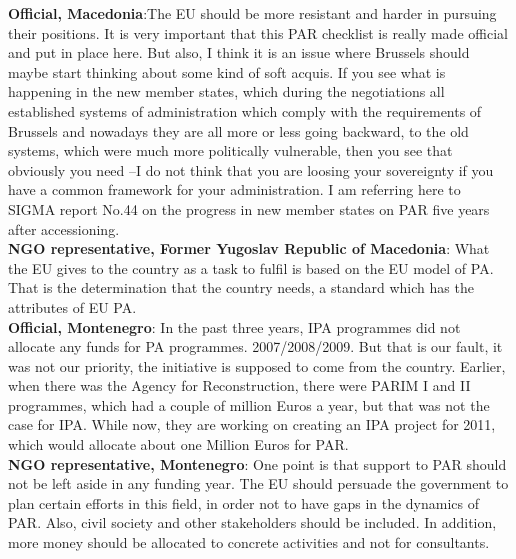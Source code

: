 \textbf{Official, Macedonia}:The EU should be more resistant and harder in pursuing their positions. It is very important that this PAR checklist is really made official and put in place here. But also, I think it is an issue where Brussels should maybe start thinking about some kind of soft acquis. If you see what is happening in the new member states, which during the negotiations all established systems of administration which comply with the requirements of Brussels and nowadays they are all more or less going backward, to the old systems, which were much more politically vulnerable, then you see that obviously you need –I do not think that you are loosing your sovereignty if you have a common framework for your administration. I am referring here to SIGMA report No.44 on the progress in new member states on PAR five years after accessioning. \\
\textbf{NGO representative, Former Yugoslav Republic of Macedonia}: What the EU gives to the country as a task to fulfil is based on the EU model of PA. That is the determination that the country needs, a standard which has the attributes of EU PA. \\
\textbf{Official, Montenegro}: In the past three years, IPA programmes did not allocate any funds for PA programmes. 2007/2008/2009. But that is our fault, it was not our priority, the initiative is supposed to come from the country. Earlier, when there was the Agency for Reconstruction, there were PARIM I and II programmes, which had a couple of million Euros a year, but that was not the case for IPA. While now, they are working on creating an IPA project for 2011, which would allocate about one Million Euros for PAR.  \\
\textbf{NGO representative, Montenegro}: One point is that support to PAR should not be left aside in any funding year. The EU should persuade the government to plan certain efforts in this field, in order not to have gaps in the dynamics of  PAR. Also, civil society and other stakeholders should be included. In addition, more money should be allocated to concrete activities and not for consultants.%
